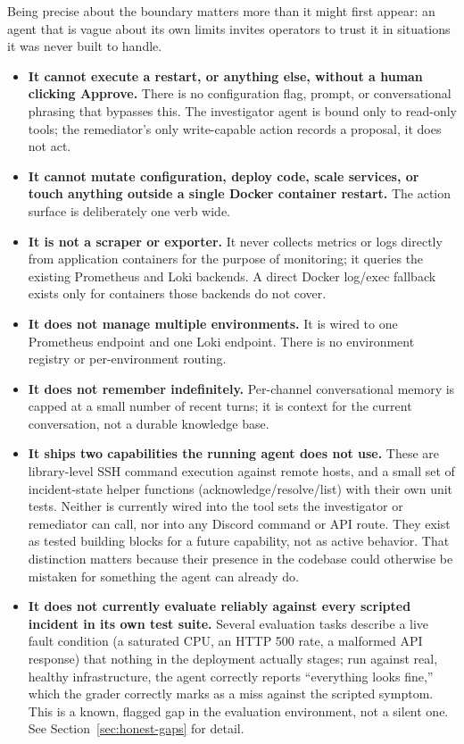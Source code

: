 \documentclass[11pt]{article}
\begin{document}
Being precise about the boundary matters more than it might first appear:
an agent that is vague about its own limits invites operators to trust it in
situations it was never built to handle.

\begin{itemize}
  \item \textbf{It cannot execute a restart, or anything else, without a
    human clicking Approve.} There is no configuration flag, prompt, or
    conversational phrasing that bypasses this. The investigator agent is
    bound only to read-only tools; the remediator's only write-capable
    action records a proposal, it does not act.
  \item \textbf{It cannot mutate configuration, deploy code, scale services,
    or touch anything outside a single Docker container restart.} The
    action surface is deliberately one verb wide.
  \item \textbf{It is not a scraper or exporter.} It never collects metrics
    or logs directly from application containers for the purpose of
    monitoring; it queries the existing Prometheus and Loki backends. A
    direct Docker log/exec fallback exists only for containers those
    backends do not cover.
  \item \textbf{It does not manage multiple environments.} It is wired to
    one Prometheus endpoint and one Loki endpoint. There is no
    environment registry or per-environment routing.
  \item \textbf{It does not remember indefinitely.} Per-channel
    conversational memory is capped at a small number of recent turns; it is
    context for the current conversation, not a durable knowledge base.
  \item \textbf{It ships two capabilities the running agent does not use.}
    These are library-level SSH command execution against remote hosts, and
    a small set of incident-state helper functions (acknowledge/resolve/list)
    with their own unit tests. Neither is currently wired into the tool sets
    the investigator or remediator can call, nor into any Discord command or
    API route. They exist as tested building blocks for a future capability,
    not as active behavior. That distinction matters because their presence
    in the codebase could otherwise be mistaken for something the agent can
    already do.
  \item \textbf{It does not currently evaluate reliably against every
    scripted incident in its own test suite.} Several evaluation tasks
    describe a live fault condition (a saturated CPU, an HTTP 500 rate, a
    malformed API response) that nothing in the deployment actually stages; run
    against real, healthy infrastructure, the agent correctly reports
    ``everything looks fine,'' which the grader correctly marks as a miss
    against the scripted symptom. This is a known, flagged gap in the
    evaluation environment, not a silent one. See
    Section~\ref{sec:honest-gaps} for detail.
\end{itemize}
\end{document}
